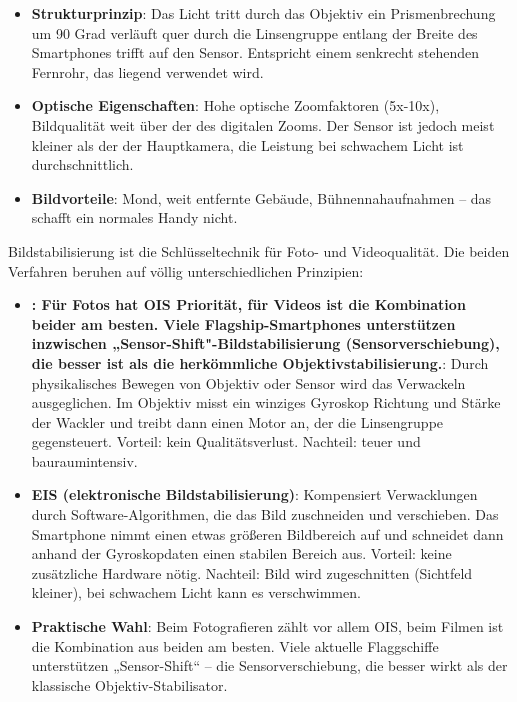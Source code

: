 \begin{itemize}
  \item \textbf{Strukturprinzip}: Das Licht tritt durch das Objektiv ein Prismenbrechung um 90 Grad verläuft quer durch die Linsengruppe entlang der Breite des Smartphones trifft auf den Sensor. Entspricht einem senkrecht stehenden Fernrohr, das liegend verwendet wird.
  \item \textbf{Optische Eigenschaften}: Hohe optische Zoomfaktoren (5x-10x), Bildqualität weit über der des digitalen Zooms. Der Sensor ist jedoch meist kleiner als der der Hauptkamera, die Leistung bei schwachem Licht ist durchschnittlich.
  \item \textbf{Bildvorteile}: Mond, weit entfernte Gebäude, Bühnennahaufnahmen – das schafft ein normales Handy nicht.
\end{itemize}


Bildstabilisierung ist die Schlüsseltechnik für Foto- und Videoqualität. Die beiden Verfahren beruhen auf völlig unterschiedlichen Prinzipien:

\begin{itemize}
  \item \textbf{: Für Fotos hat OIS Priorität, für Videos ist die Kombination beider am besten. Viele Flagship-Smartphones unterstützen inzwischen „Sensor-Shift"-Bildstabilisierung (Sensorverschiebung), die besser ist als die herkömmliche Objektivstabilisierung.}: Durch physikalisches Bewegen von Objektiv oder Sensor wird das Verwackeln ausgeglichen. Im Objektiv misst ein winziges Gyroskop Richtung und Stärke der Wackler und treibt dann einen Motor an, der die Linsengruppe gegensteuert. Vorteil: kein Qualitätsverlust. Nachteil: teuer und bauraumintensiv.
  \item \textbf{EIS (elektronische Bildstabilisierung)}: Kompensiert Verwacklungen durch Software-Algorithmen, die das Bild zuschneiden und verschieben. Das Smartphone nimmt einen etwas größeren Bildbereich auf und schneidet dann anhand der Gyroskopdaten einen stabilen Bereich aus. Vorteil: keine zusätzliche Hardware nötig. Nachteil: Bild wird zugeschnitten (Sichtfeld kleiner), bei schwachem Licht kann es verschwimmen.
  \item \textbf{Praktische Wahl}: Beim Fotografieren zählt vor allem OIS, beim Filmen ist die Kombination aus beiden am besten. Viele aktuelle Flaggschiffe unterstützen „Sensor-Shift“ – die Sensorverschiebung, die besser wirkt als der klassische Objektiv-Stabilisator.
\end{itemize}

